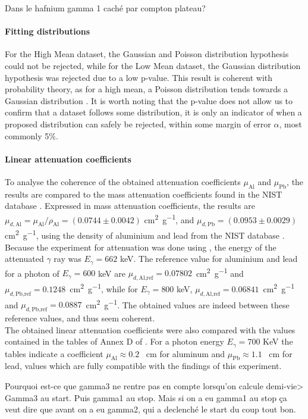 Dans le hafnium gamma 1 caché par compton plateau?

\paragraph{Fitting distributions}
For the High Mean dataset, the Gaussian and Poisson distribution hypothesis could not be rejected, while for the Low Mean dataset, the Gaussian distribution hypothesis was rejected due to a low p-value. This result is coherent with probability theory, as for a high mean, a Poisson distribution tends towards a Gaussian distribution \cite{notice_generale}. It is worth noting that the p-value does not allow us to confirm that a dataset follows some distribution, it is only an indicator of when a proposed distribution can safely be rejected, within some margin of error \(\alpha\), most commonly 5\%.

\paragraph{Linear attenuation coefficients}
To analyse the coherence of the obtained attenuation coefficients \(\mu_\textrm{Al}\) and \(\mu_\textrm{Pb}\), the results are compared to the mass attenuation coefficients found in the NIST database \cite{massic-linear-attenuation}. Expressed in mass attenuation coefficients, the results are \(\mu_{d,\textrm{Al}} = \mu_{\textrm{Al}} / \rho_\textrm{Al} = \left(0.0744 \pm 0.0042\right)\) \si{\centi\meter\squared\per\gram}, and \(\mu_{d,\textrm{Pb}} = \left(0.0953 \pm 0.0029\right)\) \si{\centi\meter\squared\per\gram}, using the density of aluminium and lead from the NIST database \cite{material-density}. Because the experiment for attenuation was done using \cesium, the energy of the attenuated \(\gamma\) ray was \(E_\gamma = 662\) keV. The reference value for aluminium and lead for a photon of \(E_\gamma = 600\) keV are \mbox{\(\mu_{d,\textrm{Al,ref}} = 0.07802\) \si{\centi\meter\squared\per\gram}} and \mbox{\(\mu_{d,\textrm{Pb,ref}} = 0.1248\) \si{\centi\meter\squared\per\gram}}, while for \(E_\gamma = 800\) keV, \mbox{\(\mu_{d,\textrm{Al,ref}} = 0.06841\) \si{\centi\meter\squared\per\gram}} and \mbox{\(\mu_{d,\textrm{Pb,ref}} = 0.0887\) \si{\centi\meter\squared\per\gram}}. The obtained values are indeed between these reference values, and thus seem coherent. \\
The obtained linear attenuation coefficients were also compared 
with the values contained in the tables of Annex D of \cite{notice_generale}.
For a photon energy $E_{\gamma} = 700$ KeV the tables indicate a coefficient 
$\mu_{\mathrm{Al}} \approx 0.2$ \unit{\per\cm} for aluminum and 
$\mu_{\mathrm{Pb}} \approx 1.1$ \unit{\per\cm} for lead,
values which are fully compatible with the findings of this experiment.

Pourquoi est-ce que gamma3 ne rentre pas en compte lorsqu'on calcule demi-vie>
Gamma3 au start. Puis gamma1 au stop. Mais si on a eu gamma1 au stop ça veut dire que avant on a eu gamma2, qui a declenché le start du coup tout bon.
